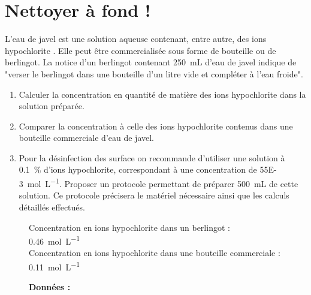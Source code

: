 \documentclass[a4paper,11pt,fleqn]{article}%
\begin{document}
\section{Nettoyer à fond !}
L’eau de javel est une solution aqueuse contenant, entre autre, des ions hypochlorite . Elle peut être commercialisée sous forme de bouteille ou de berlingot. La notice d’un berlingot contenant \SI{250}{mL} d’eau de javel indique de "verser le berlingot dans une bouteille d’un litre vide et compléter à l’eau froide".
\begin{enumerate}
    \item Calculer la concentration en quantité de matière des ions hypochlorite dans la solution préparée.
    \vspace{12em}
    \item Comparer la concentration à celle des ions hypochlorite contenus dans une bouteille commerciale d’eau de javel.
    \vspace{12em}
    \item Pour la désinfection des surface on recommande d’utiliser une solution à \SI{0,1}{\percent} d’ions hypochlorite, correspondant à une concentration de \SI{55E-3}{\mole\per\liter}. Proposer un protocole permettant de préparer \SI{500}{mL} de cette solution. Ce protocole précisera le matériel nécessaire ainsi que les calculs détaillés effectués.
    \vspace{12em}
\end{enumerate}
\begin{figure}[b]
    \begin{minipage}{\linewidth}
        \caption*{\textbf{Données :}}
        Concentration en ions hypochlorite dans un berlingot : \SI{0,46}{\mole\per\liter}\\
Concentration en ions hypochlorite dans une bouteille commerciale : \SI{0,11}{\mole\per\liter}
    \end{minipage}
\end{figure}
\end{document}
